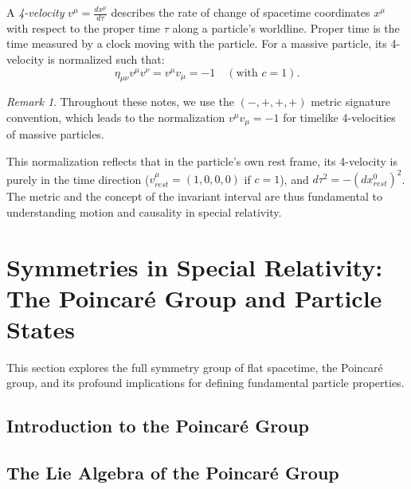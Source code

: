 \documentclass{amsart}
\theoremstyle{definition}
\theoremstyle{remark}
\newtheorem*{remark}{Remark}
\begin{document}
A \emph{4-velocity} $v^\mu = \frac{dx^\mu}{d\tau}$ describes the rate of change of spacetime coordinates $x^\mu$ with respect to the proper time $\tau$ along a particle's worldline.
Proper time is the time measured by a clock moving with the particle.
For a massive particle, its 4-velocity is normalized such that:
\begin{equation*}
  \eta_{\mu\nu} v^\mu v^\nu = v^\mu v_\mu = -1 \quad (\text{with } c=1).
\end{equation*}
\begin{remark}
Throughout these notes, we use the $(-,+,+,+)$ metric signature convention, which leads to the normalization $v^\mu v_\mu = -1$ for timelike 4-velocities of massive particles.
\end{remark}
This normalization reflects that in the particle's own rest frame, its 4-velocity is purely in the time direction ($v^\mu_{rest} = (1,0,0,0)$ if $c=1$), and $d\tau^2 = -(dx^0_{rest})^2$.
The metric and the concept of the invariant interval are thus fundamental to understanding motion and causality in special relativity.

\section{Symmetries in Special Relativity: The Poincaré Group and Particle States}
\label{sec:poincare_particle_states}

This section explores the full symmetry group of flat spacetime, the Poincaré group, and its profound implications for defining fundamental particle properties.

\subsection{Introduction to the Poincaré Group}
\label{subsec:intro_poincare}

\subsection{The Lie Algebra of the Poincaré Group}
\label{subsec:poincare_algebra}
\end{document}
